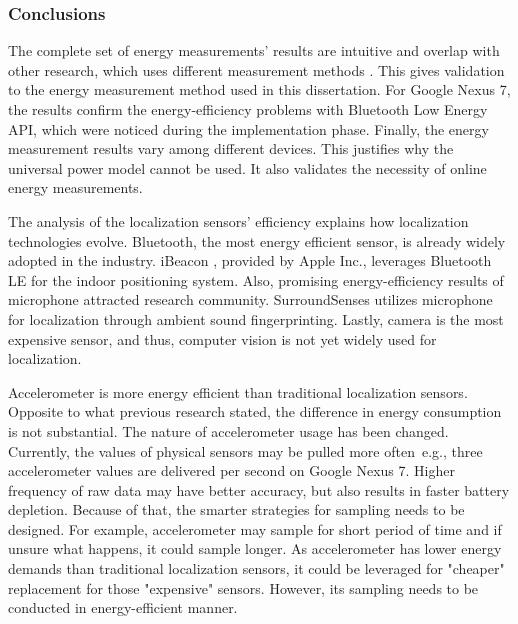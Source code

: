 
\subsubsection{Conclusions}
\hspace{10pt} The complete set of energy measurements' results are intuitive and overlap with other research, which uses different measurement methods \cite{constandache:localization} \cite{wang:eemss} \cite{chon:smartdc}. This gives validation to the energy measurement method used in this dissertation. For Google Nexus 7, the results confirm the energy-efficiency problems with Bluetooth Low Energy API, which were noticed during the implementation phase. Finally, the energy measurement results vary among different devices. This justifies why the universal power model cannot be used. It also validates the necessity of online energy measurements. 

The analysis of the localization sensors' efficiency explains how localization technologies evolve. Bluetooth, the most energy efficient sensor, is already widely adopted in the industry. iBeacon \cite{apple:ibeacon}, provided by Apple Inc.,  leverages Bluetooth LE for the indoor positioning system. Also, promising energy-efficiency results of microphone attracted research community. SurroundSenses \cite{azizyan:surroundsense} utilizes microphone for localization through ambient sound fingerprinting. Lastly, camera is the most expensive sensor, and thus, computer vision is not yet widely used for localization.

Accelerometer is more energy efficient than traditional localization sensors. Opposite to what previous research\cite{benabdesslem:senseless} stated, the difference in energy consumption is not substantial. The nature of accelerometer usage has been changed. Currently, the values of physical sensors may be pulled more often\ e.g., three accelerometer values are delivered per second on Google Nexus 7. Higher frequency of raw data may have better accuracy, but also results in faster battery depletion.  Because of that, the smarter strategies for sampling needs to be designed. For example, accelerometer may sample for short period of time and if unsure what happens, it could sample longer. As accelerometer has lower energy demands than traditional localization sensors, it could be leveraged for "cheaper" replacement for those "expensive" sensors. However, its sampling needs to be conducted in energy-efficient manner. 

